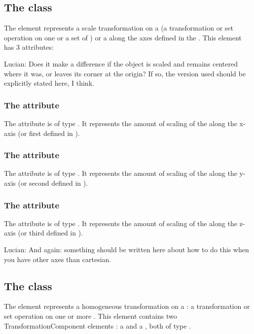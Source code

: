 \subsection{The  class}
\label{CSGScale-class}
The \CSGScale element represents a scale transformation on a \CSGNode (a transformation or set operation on one or a set of \CSGPrimitives) or a \CSGPrimitive along the axes defined in the \Geometry. This element has 3 attributes:

{\color{red} Lucian: \notice Does it make a difference if the object is scaled and remains centered where it was, or leaves its corner at the origin?  If so, the version used should be explicitly stated here, I think.}

\subsubsection{The  attribute}
The  attribute is of type . It represents the amount of scaling of the \CSGNode along the x-axis (or first \CoordinateComponent defined in \Geometry).

\subsubsection{The  attribute}
The  attribute is of type . It represents the amount of scaling of the \CSGNode along the y-axis (or second \CoordinateComponent defined in \Geometry).

\subsubsection{The  attribute}
The  attribute is of type . It represents the amount of scaling of the \CSGNode along the z-axis (or third \CoordinateComponent defined in \Geometry).

{\color{red} Lucian: \notice And again: something should be written here about how to do this when you have other axes than cartesian.}

\subsection{The  class}
\label{CSGHomogeneousTransformation-class}
The \CSGHomogeneousTransformation element represents a homogeneous transformation on a \CSGNode: a transformation or set operation on one or more \CSGPrimitives. This element contains two TransformationComponent elements : a  and a , both of type \TransformationComponent.

